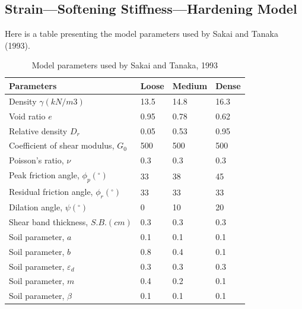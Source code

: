 \documentclass[a4paper, nobind]{templates/ociamthesis}
\begin{document}
\hypertarget{strainsoftening-stiffnesshardening-model-1}{%
\subsection{Strain---Softening Stiffness---Hardening Model}\label{strainsoftening-stiffnesshardening-model-1}}

Here is a table presenting the model parameters used by Sakai and Tanaka (1993).

\begin{table}[H]
\centering
{%
\begin{tabular}{@{}llll@{}}
\toprule
Parameters                                       & Loose & Medium & Dense \\ \midrule
Density $\gamma (kN/m3)$                       & 13.5  & 14.8   & 16.3  \\
Void ratio $e$                                   & 0.95  & 0.78   & 0.62  \\
Relative density $D_r$                           & 0.05  & 0.53   & 0.95  \\
Coefficient of shear modulus, $G_0$              & 500   & 500    & 500   \\
Poisson's ratio, $\nu$                           & 0.3   & 0.3    & 0.3   \\
Peak friction angle, $\phi_p (^{\circ})$       & 33    & 38     & 45    \\
Residual friction angle, $\phi_r (^{\circ})$   & 33    & 33     & 33    \\
Dilation angle, $\psi (^{\circ})$              & 0     & 10     & 20    \\
Shear band thickness, $S.B. (cm)$                & 0.3   & 0.3    & 0.3   \\
Soil parameter, $a$                              & 0.1   & 0.1    & 0.1   \\
Soil parameter, $b$                              & 0.8   & 0.4    & 0.1   \\
Soil parameter, $\varepsilon_d$                 & 0.3   & 0.3    & 0.3   \\
Soil parameter, $m$                              & 0.4   & 0.2    & 0.1   \\
Soil parameter, $\beta$                          & 0.1   & 0.1    & 0.1   \\ \bottomrule
\end{tabular}%
}
\caption{Model parameters used by Sakai and Tanaka, 1993}
\label{tab: model parameters used by Sakai and Tanaka, 1993}
\end{table}
\end{document}
